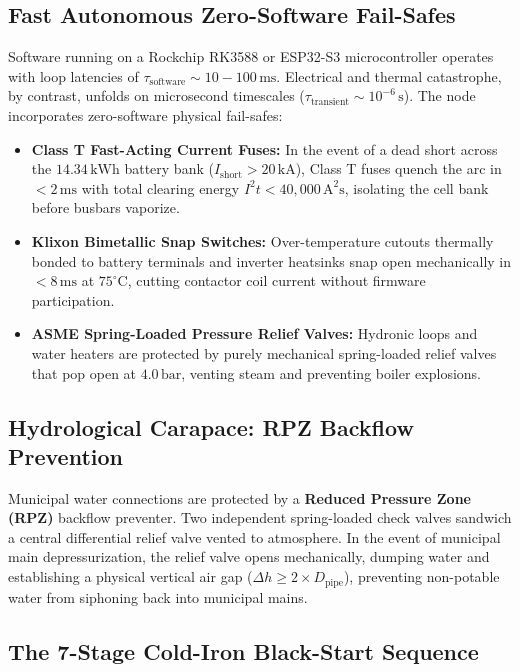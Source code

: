 \subsection{Fast Autonomous Zero-Software Fail-Safes}
Software running on a Rockchip RK3588 or ESP32-S3 microcontroller operates with loop latencies of $\tau_{\mathrm{software}} \sim 10 - 100\,\mathrm{ms}$. Electrical and thermal catastrophe, by contrast, unfolds on microsecond timescales ($\tau_{\mathrm{transient}} \sim 10^{-6}\,\mathrm{s}$). The node incorporates zero-software physical fail-safes:
\begin{itemize}
    \item \textbf{Class T Fast-Acting Current Fuses:} In the event of a dead short across the $14.34\,\mathrm{kWh}$ battery bank ($I_{\mathrm{short}} > 20\,\mathrm{kA}$), Class T fuses quench the arc in $<2\,\mathrm{ms}$ with total clearing energy $I^2 t < 40{,}000\,\mathrm{A^2 s}$, isolating the cell bank before busbars vaporize.
    \item \textbf{Klixon Bimetallic Snap Switches:} Over-temperature cutouts thermally bonded to battery terminals and inverter heatsinks snap open mechanically in $<8\,\mathrm{ms}$ at $75^\circ\mathrm{C}$, cutting contactor coil current without firmware participation.
    \item \textbf{ASME Spring-Loaded Pressure Relief Valves:} Hydronic loops and water heaters are protected by purely mechanical spring-loaded relief valves that pop open at $4.0\,\mathrm{bar}$, venting steam and preventing boiler explosions.
\end{itemize}

\subsection{Hydrological Carapace: RPZ Backflow Prevention}
Municipal water connections are protected by a \textbf{Reduced Pressure Zone (RPZ)} backflow preventer. Two independent spring-loaded check valves sandwich a central differential relief valve vented to atmosphere. In the event of municipal main depressurization, the relief valve opens mechanically, dumping water and establishing a physical vertical air gap ($\Delta h \ge 2 \times D_{\mathrm{pipe}}$), preventing non-potable water from siphoning back into municipal mains.

\subsection{The 7-Stage Cold-Iron Black-Start Sequence}
\label{subsec:cold_iron_black_start}

